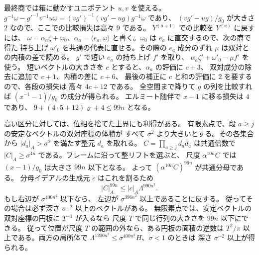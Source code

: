 最終商では箱に動かすユニポテント \(u,v\) を使える。
\(g^{-1}\omega-g'^{-1}v^{-1}u\omega
=(vg')^{-1}(vg'-ug)g^{-1}\omega\) であり、
\((vg'-ug)/g_0\) が大きさ \(2\) なので、ここでの比較損失は高々 \(9\) である。
\(Y^{(a+1)}\) での比較を \(Y^{(a)}\) に戻すには、
\(\omega=\alpha_a\zeta+\omega_0\)、\(\alpha_a=\langle e_a,\omega\rangle\)
と書く。\(\omega_0\) は \(e_a\) に直交するので、次の商で得た
持ち上げ \(\omega'_0\) を共通の代表に直せる。その際の \(e_a\) 成分のずれ
\(\mu\) は双対との内積の差で読める。
\(g'\) で短い \(e_a\) の持ち上げ \(f'\) を取り、
\(\alpha_a\zeta'+\omega'_0-\mu f'\) を使う。
短いベクトルの大きさを \(c\) とすると、\(\alpha_a\) の評価に \(c+3\)、
双対成分の除去に追加で \(c+1\)、内積の差に \(c+6\)、
最後の補正に \(c\) と和の評価に \(2\) を要するので、各段の損失は
高々 \(4c+12\) である。
全空間まで降りて \(g\) の列を比較すれば \((x^{-1}-1)/g_0\) の成分が得られる。
エルミート随伴で \(x-1\) に移る損失は \(4\) であり、
\(9+(4\cdot5+12)\varrho+4\le99n\) となる。

高い区分に対しては、位相を捨てた上界にも利得がある。
有限素点で、段 \(a\ge j\) の安定なベクトルの双対座標の体積が
すべて \(\sigma^2\) より大きいとする。その各集合から
\(|d_a|_A>\sigma^2\) を満たす整元 \(d_a\) を取れる。
\(C=\prod_{a\ge j}d_a\bar d_a\) は共通倍数で
\(|C|_A\ge\sigma^{4n}\) である。フレームに沿って整リフトを選ぶと、
尺度 \(\alpha^{10n}C\) では \((x-1)/g_0\) は大きさ \(99n\) 以下となる。
よって \((\alpha^{10n}C)^{99n}\) が共通分母である。
分母イデアルの生成元 \(c\) はこれを割るため
\[
 |C|_A^{99n}\le |c|_A\Lambda^{990n^2}.
\]
もし右辺が \(\sigma^{400n^2}\) 以下なら、
左辺が \(\sigma^{396n^2}\) 以上であることに反する。
従ってその場合は必ず深さ \(\sigma^{-2}\) 以上のベクトルがある。
無限素点では、安定ベクトルの双対座標の円板に \(T^{-1}\) が入るなら
尺度 \(T\) で同じ行列の大きさを \(99n\) 以下にできる。
従って位置が尺度 \(T\) の範囲の外なら、ある円板の面積の逆数は
\(T^2/\pi\) 以上である。両方の局所体で
\(\Lambda^{1200n^2}\le \sigma^{400n^2}H\)、\(\sigma<1\) のときは
深さ \(\sigma^{-2}\) 以上が得られる。

